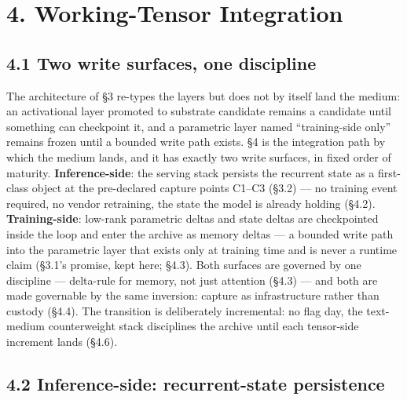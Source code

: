 \documentclass[11pt]{article}
\begin{document}
\section{4. Working-Tensor Integration}\label{working-tensor-integration}

\subsection{4.1 Two write surfaces, one discipline}\label{two-write-surfaces-one-discipline}

The architecture of \S{}3 re-types the layers but does not by itself land the medium: an activational layer promoted to substrate candidate remains a candidate until something can checkpoint it, and a parametric layer named ``training-side only'' remains frozen until a bounded write path exists. \S{}4 is the integration path by which the medium lands, and it has exactly two write surfaces, in fixed order of maturity. \textbf{Inference-side}: the serving stack persists the recurrent state as a first-class object at the pre-declared capture points C1--C3 (\S{}3.2) --- no training event required, no vendor retraining, the state the model is already holding (\S{}4.2). \textbf{Training-side}: low-rank parametric deltas and state deltas are checkpointed inside the loop and enter the archive as memory deltas --- a bounded write path into the parametric layer that exists only at training time and is never a runtime claim (\S{}3.1's promise, kept here; \S{}4.3). Both surfaces are governed by one discipline --- delta-rule for memory, not just attention (\S{}4.3) --- and both are made governable by the same inversion: capture as infrastructure rather than custody (\S{}4.4). The transition is deliberately incremental: no flag day, the text-medium counterweight stack disciplines the archive until each tensor-side increment lands (\S{}4.6).

\subsection{4.2 Inference-side: recurrent-state persistence}\label{inference-side-recurrent-state-persistence}
\end{document}
